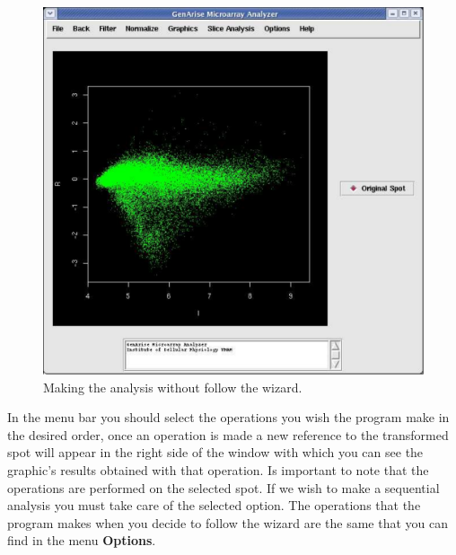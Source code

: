 \documentclass[12pt]{article}
\begin{document}
\begin{figure}
\begin{center}
\includegraphics[scale= 0.3]{./images/original.pdf}
\caption{Making the analysis without follow the wizard. \label{fig25}}
\end{center}
\end{figure}

In the menu bar you should select the operations you wish the program make in the desired order, once an operation is made a new reference to the transformed spot will appear in the right side of the window with which you can see the graphic's results obtained with that operation. Is important to note that the operations are performed on the selected spot. If we wish to make a sequential analysis you must take care of the selected option. The operations that the program makes when you decide to follow the wizard are the same that you can find in the menu \textbf{Options}.\\
\end{document}
